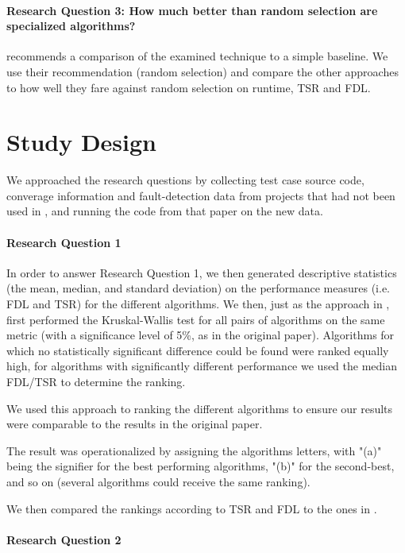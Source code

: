 \paragraph{Research Question 3: How much better than random selection are specialized algorithms?}

\cite{khan2018systematic} recommends a comparison of the examined
technique to a simple baseline. We use their recommendation (random
selection) and compare the other approaches to how well they fare against
random selection on runtime, TSR and FDL.

\section{Study Design}

We approached the research questions by collecting test case source code,
converage information and fault-detection data from projects that had
not been used in \cite{cruciani2019scalable}, and running the code from
that paper on the new data.

\paragraph{Research Question 1}

In order to answer Research Question 1, we then generated descriptive
statistics (the mean, median, and standard deviation) on the performance
measures (i.e. FDL and TSR) for the different algorithms. We then,
just as the approach in \cite{cruciani2019scalable}, first performed the
Kruskal-Wallis test for all pairs of algorithms on the same metric (with
a significance level of 5\%, as in the original paper). Algorithms for
which no statistically significant difference could be found were ranked
equally high, for algorithms with significantly different performance
we used the median FDL/TSR to determine the ranking.

We used this approach to ranking the different algorithms to ensure our
results were comparable to the results in the original paper.

The result was operationalized by assigning the algorithms letters,
with "(a)" being the signifier for the best performing algorithms,
"(b)" for the second-best, and so on (several algorithms could receive
the same ranking).

We then compared the rankings according to TSR and FDL to the ones in
\cite{cruciani2019scalable}.

\paragraph{Research Question 2}

